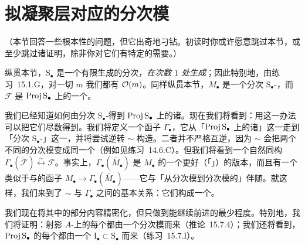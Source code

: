 
\section{拟凝聚层对应的分次模}

（本节回答一些根本性的问题，但它出奇地刁钻。初读时你或许愿意跳过本节，或至少跳过诸证明，除非你对它们有特定的需要。）

纵贯本节，$\mathrm{S}_\bullet$ 是一个有限生成的分次\trAlgebra，\emph{在次数 $1$ 处生成}；因此特别地，由\mbox{练习~15.1.G}，对一切 $m$ 我们都有\trInvertibleSheaf{} $\mathcal{O}(m)$。同样纵贯本节，$M_\bullet$ 是一个分次 $\mathrm{S}_\bullet$-\trModule，而 $\mathscr{F}$ 是 $\operatorname{Proj} \mathrm{S}_\bullet$ 上的一个\trQCSheaf。

我们已经知道如何由分次 $\mathrm{S}_\bullet$-\trModule{}得到 $\operatorname{Proj} \mathrm{S}_\bullet$ 上的诸\trQCSheaf。现在我们将看到：用这一办法可以把它们尽数得到。我们将定义一个函子 $\Gamma_\bullet$，它从「$\operatorname{Proj} \mathrm{S}_\bullet$ 上的诸\trQCSheaf」这一\trCategory{}走到「分次 $\mathrm{S}_\bullet$-\trModule」这一\trCategory，并将尝试逆转 $\sim$ 构造。二者并不严格互逆，因为 $\sim$ 会把两个不同的分次模变成同一个\trQCSheaf（例如见\mbox{练习~14.6.C}）。但我们将看到一个自然同构 $\Gamma_\bullet(\widetilde{\mathscr{F}})\overset{\sim}{\longleftrightarrow}\mathscr{F}$。事实上，$\Gamma_\bullet(\widetilde{M_\bullet})$ 是 $M_\bullet$ 的一个更好（「\trSaturated」）的版本，而且有一个类似于\trGroupification{}与\trSheafification{}的\trSaturation{}函子 $M_\bullet\to\Gamma_\bullet(\widetilde{M_\bullet})$——它与「从\trSaturated{}分次模到分次模的\trForgetfulFunctor」伴随。就这样，我们来到了 $\sim$ 与 $\Gamma_\bullet$ 之间的基本关系：它们构成一个\trAdjointPair。

\begin{center}
\end{center}

我们现在将其中的部分内容精密化，但只做到能继续前进的最少程度。特别地，我们将证明：射影 $A$-\trScheme{}上的每个\trQCSheaf{}都由一个分次模而来（\mbox{推论~15.7.4}）；我们还将看到，$\operatorname{Proj} \mathrm{S}_\bullet$ 的每个\trClosedSubscheme{}都由一个\trHomogeneous\trIdeal{} $\mathrm{I}_\bullet\subset\mathrm{S}_\bullet$ 而来（\mbox{练习~15.7.I}）。

